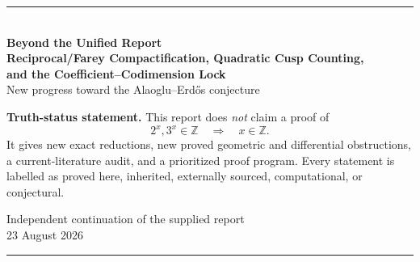 \documentclass[10pt,oneside]{article}
\theoremstyle{definition}
\theoremstyle{remark}
\newcommand{\Z}{\mathbb Z}
\begin{document}
\hypersetup{pageanchor=false}

\begin{titlepage}
\centering
\vspace*{1.4cm}
{\color{navy}\rule{\textwidth}{1.2pt}}\\[1.1cm]
{\Huge\bfseries Beyond the Unified Report\\[0.25cm]}
{\LARGE\bfseries Reciprocal/Farey Compactification, Quadratic Cusp Counting,\\
 and the Coefficient--Codimension Lock\\[0.8cm]}
{\Large New progress toward the Alaoglu--Erd\H{o}s conjecture}\\[1.4cm]
\begin{tcolorbox}[width=0.88\textwidth,colback=paleamber,colframe=amber,boxrule=0.8pt,arc=2mm]
\centering
\textbf{Truth-status statement.} This report does \emph{not} claim a proof of
\[
 2^x,3^x\in\Z \quad\Longrightarrow\quad x\in\Z.
\]
It gives new exact reductions, new proved geometric and differential obstructions, a current-literature audit, and a prioritized proof program. Every statement is labelled as proved here, inherited, externally sourced, computational, or conjectural.
\end{tcolorbox}
\vfill
{\large Independent continuation of the supplied report}\\[0.3cm]
{\large 23 August 2026}\\[0.8cm]
{\color{navy}\rule{\textwidth}{1.2pt}}
\end{titlepage}
\hypersetup{pageanchor=true}
\end{document}
